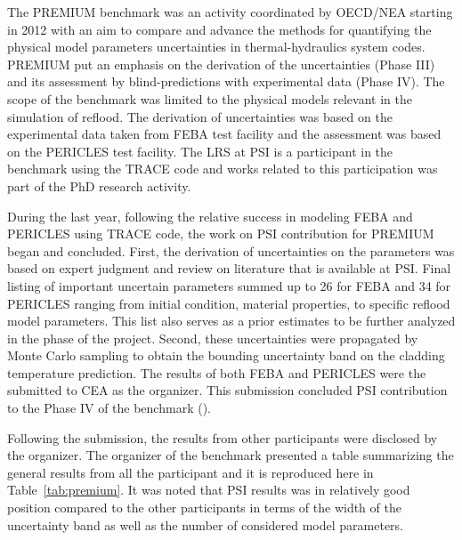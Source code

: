 \documentclass[11pt,titlepage]{article}
\begin{document}
The PREMIUM benchmark was an activity coordinated by OECD/NEA starting in 2012 
with an aim to compare and advance the methods for quantifying the physical 
model parameters uncertainties in thermal-hydraulics system codes.
PREMIUM put an emphasis on the derivation of the uncertainties (Phase III) and 
its assessment by blind-predictions with experimental data (Phase IV).
The scope of the benchmark was limited to the physical models relevant in the 
simulation of reflood.
The derivation of uncertainties was based on the experimental data taken from 
FEBA test facility and the assessment was based on the PERICLES test facility.
The LRS at PSI is a participant in the benchmark using the TRACE code and 
works related to this participation was part of the PhD research activity.

During the last year, following the relative success in modeling FEBA and 
PERICLES using TRACE code, the work on PSI contribution for PREMIUM began 
and concluded.
First, the derivation of uncertainties on the parameters was based on expert 
judgment and review on literature that is available at PSI.
Final listing of important uncertain parameters summed up to 26 for FEBA and 
34 for PERICLES ranging from initial condition, material properties, to 
specific reflood model parameters.
This list also serves as a prior estimates to be further analyzed 
in the phase of the project.
Second, these uncertainties were propagated by Monte Carlo sampling to obtain
the bounding uncertainty band on the cladding temperature prediction.
The results of both FEBA and PERICLES were the submitted to CEA as the 
organizer. 
This submission concluded PSI contribution to the Phase IV of the benchmark 
(\cite{Wicaksono2014a, Wicaksono2014c}).

Following the submission, the results from other participants were disclosed by
the organizer.
The organizer of the benchmark presented a table summarizing the general results
from all the participant and it is reproduced here in Table~\ref{tab:premium}.
It was noted that PSI results was in relatively good position compared to the
other participants in terms of the width of the uncertainty band as well as the
number of considered model parameters.
\end{document}
